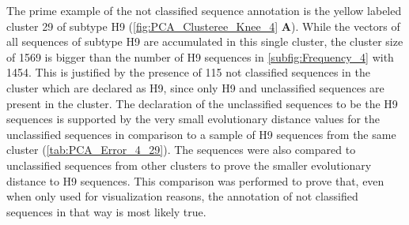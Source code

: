 \begin{table}[!hbt]
    \centering
    \caption[Unclassified sequences in segment 4 cluster 29 with PK]{\textbf{Unclassified sequences in segment 4 cluster 29 with PK.} The \glspl{MSA} mean distance of the given sequences in comparison to a sample of H9 sequences of the same cluster and a sample of unclassified sequences present in other clusters. Only the first 20 columns are presented here, the full table can be found in the projects GitHub Repository\footnotemark.}
    \label{tab:PCA_Error_4_29}
\end{table}

\vspace{1em}

The prime example of the not classified sequence annotation is the yellow labeled cluster 29 of subtype H9 (\autoref{fig:PCA_Clusteree_Knee_4} \textbf{\textsf{A}}). While the vectors of all sequences of subtype H9 are accumulated in this single cluster, the cluster size of 1569 is bigger than the number of H9 sequences in \autoref{subfig:Frequency_4} with 1454. This is justified by the presence of 115 not classified sequences in the cluster which are declared as H9, since only H9 and unclassified sequences are present in the cluster. The declaration of the unclassified sequences to be the H9 sequences is supported by the very small evolutionary distance values for the unclassified sequences in comparison to a sample of H9 sequences from the same cluster (\autoref{tab:PCA_Error_4_29}). The sequences were also compared to unclassified sequences from other clusters to prove the smaller evolutionary distance to H9 sequences. This comparison was performed to prove that, even when only used for visualization reasons, the annotation of not classified sequences in that way is most likely true.

